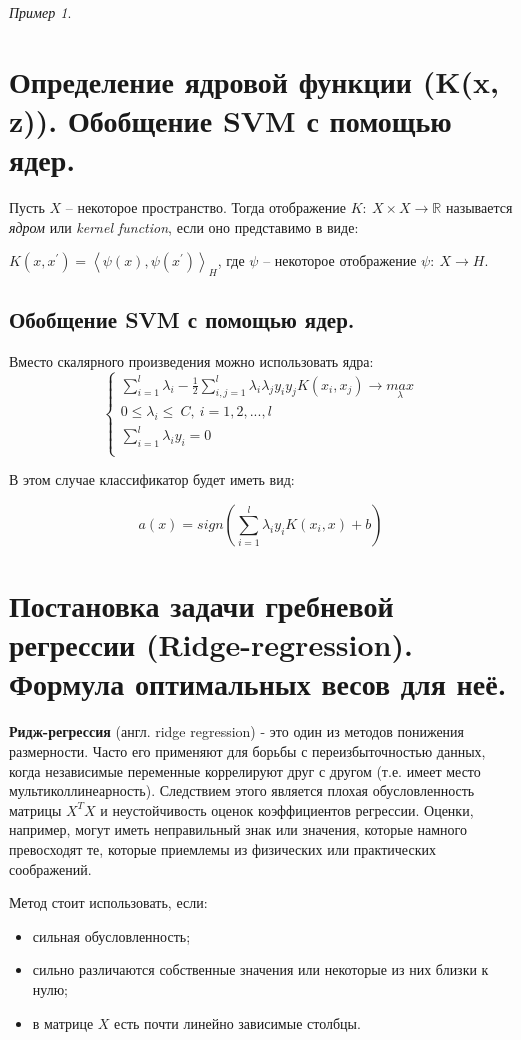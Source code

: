 \documentclass[a4paper, 12pt]{article}
\theoremstyle{plain} %
\theoremstyle{definition} %
\theoremstyle{remark} %
\newtheorem{example}{Пример}
\begin{document}
\begin{example}
\section{Определение ядровой функции (K(x, z)). Обобщение SVM с помощью ядер.}

Пусть $X$ – некоторое пространство. Тогда отображение $K:\ X \times X \to \mathbb R$ называется \emph{ядром} или \emph{kernel function}, если оно представимо в виде:

$K \left(x,x^{\prime} \right) = \left< \psi(x), \psi (x^{\prime}) \right>_H $, где $ \psi $ – некоторое отображение $\psi:\ X \to H $.

\subsection{Обобщение SVM с помощью ядер.}

Вместо скалярного произведения можно использовать ядра:
\[
	\begin{cases} \sum_{i=1}^{l} \lambda_i - \frac{1}{2} \sum_{i,j=1}^{l} \lambda_i \lambda_j y_i y_j K(x_i,x_j) \rightarrow \underset{\lambda}{max} \\ 0 \le \lambda_i \le\ C,\ i=1,2,...,l \\ \sum_{i=1}^{l} \lambda_i y_i = 0 \\ \end{cases}
\]


В этом случае классификатор будет иметь вид:

\[
	a(x)= sign(\sum_{i=1}^{l} \lambda_i y_i K(x_i, x) + b)
\]


\section{Постановка задачи гребневой регрессии (Ridge-regression). Формула оптимальных весов для неё.}

\textbf{Ридж-регрессия} (англ. ridge regression) - это один из методов понижения размерности. Часто его применяют для борьбы с переизбыточностью данных, когда независимые переменные коррелируют друг с другом (т.е. имеет место мультиколлинеарность). Следствием этого является плохая обусловленность матрицы $X^T X$ и неустойчивость оценок коэффициентов регрессии. Оценки, например, могут иметь неправильный знак или значения, которые намного превосходят те, которые приемлемы из физических или практических соображений.

Метод стоит использовать, если:
\begin{itemize}
	\item сильная обусловленность;
	\item сильно различаются собственные значения или некоторые из них близки к нулю;
	\item в матрице $X$ есть почти линейно зависимые столбцы.
\end{itemize}


\end{example}
\end{document}
